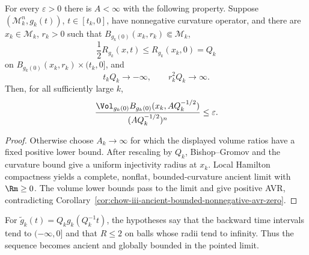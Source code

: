 \begin{proposition}
\label{prop:chow-iii-almost-ancient-large-scale-collapse}
For every $\varepsilon>0$ there is $A<\infty$ with the following property.
Suppose $(\mathcal M_k^n,g_k(t))$, $t\in[t_k,0]$, have nonnegative curvature
operator, and there are $x_k\in\mathcal M_k$, $r_k>0$ such that
$B_{g_k(0)}(x_k,r_k)\Subset\mathcal M_k$,
\[
 \frac12R_{g_k}(x,t)\le R_{g_k}(x_k,0)=Q_k
\]
on $B_{g_k(0)}(x_k,r_k)\times(t_k,0]$, and
\[
 t_kQ_k\longrightarrow-\infty,
 \qquad r_k^2Q_k\longrightarrow\infty.
\]
Then, for all sufficiently large $k$,
\[
 \frac{\Vol_{g_k(0)}B_{g_k(0)}(x_k,AQ_k^{-1/2})}
 {(AQ_k^{-1/2})^n}\le\varepsilon.
\]
\end{proposition}
\begin{proof}
\sketch Otherwise choose $A_k\to\infty$ for which the displayed volume ratios have a
fixed positive lower bound.  After rescaling by $Q_k$, Bishop--Gromov and the
curvature bound give a uniform injectivity radius at $x_k$.  Local Hamilton
compactness yields a complete, nonflat, bounded-curvature ancient limit with
$\Rm\ge0$.  The volume lower bounds pass to the limit and give positive AVR,
contradicting Corollary~\ref{cor:chow-iii-ancient-bounded-nonnegative-avr-zero}.
\end{proof}

\begin{remark}
\label{rem:chow-iii-almost-ancient-rescaling}
For $\widetilde g_k(t)=Q_kg_k(Q_k^{-1}t)$, the hypotheses say that the
backward time intervals tend to $(-\infty,0]$ and that $R\le2$ on balls whose
radii tend to infinity.  Thus the sequence becomes ancient and globally
bounded in the pointed limit.
\end{remark}

